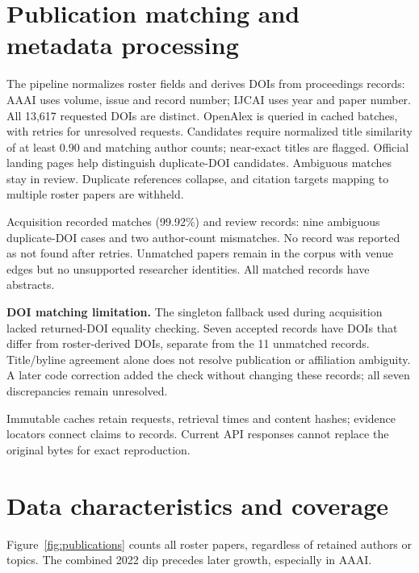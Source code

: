 \section{Publication matching and metadata processing}
The pipeline normalizes roster fields and derives DOIs from proceedings records:
AAAI uses volume, issue and record number; IJCAI uses year and paper number.
All 13,617 requested DOIs are distinct. OpenAlex is queried in cached batches,
with retries for unresolved requests. Candidates require normalized title
similarity of at least 0.90 and matching author counts; near-exact titles are
flagged. Official landing pages help distinguish duplicate-DOI candidates.
Ambiguous matches stay in review. Duplicate references collapse, and citation
targets mapping to multiple roster papers are withheld.

Acquisition recorded \MatchedWorks{} matches (99.92\%) and \UnmatchedWorks{}
review records: nine ambiguous duplicate-DOI cases and two author-count
mismatches. No record was reported as not found after retries. Unmatched papers
remain in the corpus with venue edges but no unsupported researcher identities.
All matched records have abstracts.

\textbf{DOI matching limitation.} The singleton fallback used during acquisition
lacked returned-DOI equality checking. Seven accepted records have DOIs that
differ from roster-derived DOIs, separate from the 11 unmatched records.
Title/byline agreement alone does not resolve publication or affiliation
ambiguity. A later code correction added the check without changing these
records; all seven discrepancies remain unresolved.

Immutable caches retain requests, retrieval times and content hashes; evidence
locators connect claims to records. Current API responses cannot replace the
original bytes for exact reproduction.

\section{Data characteristics and coverage}
Figure~\ref{fig:publications} counts all roster papers, regardless of retained
authors or topics. The combined 2022 dip precedes later growth, especially in AAAI.


